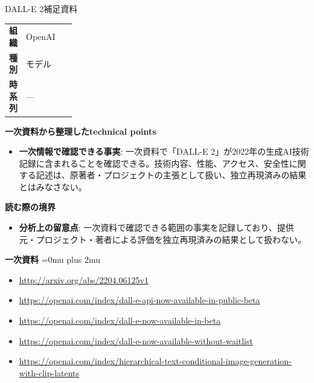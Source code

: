 \begin{technicalnote}{DALL-E 2}{補足資料}
\begingroup
\begin{tabularx}{\linewidth}{@{}>{\bfseries}p{0.22\linewidth}X@{}}
組織 & OpenAI \\
種別 & モデル \\
時系列 & — \\
\end{tabularx}
\smallskip
{\bfseries 一次資料から整理したtechnical points}
\begin{itemize}[leftmargin=1.5em,itemsep=0.35em]
\item \textbf{一次情報で確認できる事実}: 一次資料で「DALL-E 2」が2022年の生成AI技術記録に含まれることを確認できる。技術内容、性能、アクセス、安全性に関する記述は、原著者・プロジェクトの主張として扱い、独立再現済みの結果とはみなさない。
\end{itemize}
\begin{minipage}{\linewidth}
{\bfseries 読む際の境界}
\begin{itemize}[leftmargin=1.5em,itemsep=0.35em]
\item \textbf{分析上の留意点}: 一次資料で確認できる範囲の事実を記録しており、提供元・プロジェクト・著者による評価を独立再現済みの結果として扱わない。
\end{itemize}
\begin{samepage}
{\bfseries 一次資料}
\begingroup\sloppy
\Urlmuskip=0mu plus 2mu\relax
\begin{itemize}[leftmargin=1.5em,itemsep=0.25em]
\item {\scriptsize\url{http://arxiv.org/abs/2204.06125v1}}
\item {\scriptsize\url{https://openai.com/index/dall-e-api-now-available-in-public-beta}}
\item {\scriptsize\url{https://openai.com/index/dall-e-now-available-in-beta}}
\item {\scriptsize\url{https://openai.com/index/dall-e-now-available-without-waitlist}}
\item {\scriptsize\url{https://openai.com/index/hierarchical-text-conditional-image-generation-with-clip-latents}}
\end{itemize}
\endgroup
\end{samepage}
\end{minipage}
\endgroup
\end{technicalnote}
\medskip

